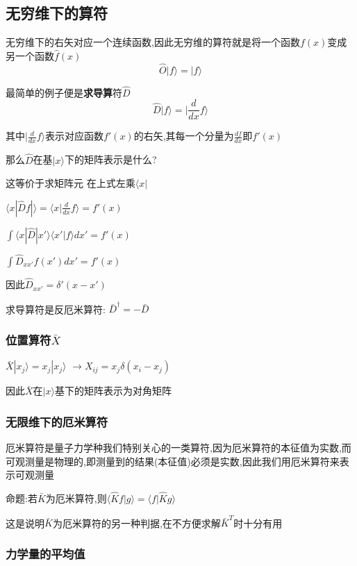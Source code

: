 \documentclass[lang=cn,10pt]{elegantbook}
\begin{document}
 \subsection{无穷维下的算符}
 无穷维下的右矢对应一个连续函数,因此无穷维的算符就是将一个函数$f(x)$变成另一个函数$\hat{f}(x)$
 \begin{equation*}
 	\hat{O}|f\rangle=|\hat{f}\rangle
 \end{equation*}
 
 最简单的例子便是\textbf{求导算}符$\hat{D}$
 \begin{equation*}
 		\hat{D}|f\rangle=|\frac{d}{dx}f\rangle
 \end{equation*}
 
 其中$|\frac{d}{dx}f\rangle$表示对应函数$f'(x)$的右矢,其每一个分量为$\frac{df}{dx}$即$f'(x)$
 
 那么$\hat{D}$在基$|x\rangle$下的矩阵表示是什么?
 
 这等价于求矩阵元
 在上式左乘$\langle x|$
 
 $\langle x|\hat{D}f|\rangle=\langle x|\frac{d}{dx}f\rangle=f'(x)$
 
 $\int{\langle x|\hat{D}|x'\rangle \langle x'|f\rangle dx' =f'(x)}$
 
 $\int{\hat{D}_{xx'}f\left( x' \right) dx'=f\prime(x)}$
 
 因此$\hat{D}_{xx'}=\delta'(x-x')$
 
 求导算符是反厄米算符: $\bar{D}^\dagger=-\bar{D}$
 
 \subsubsection{位置算符$\bar{X}$}
 $\bar{X}|x_j\rangle=x_j|x_j\rangle$
 $\rightarrow X_{ij}=x_j\delta(x_i-x_j)$
 
 因此$\bar{X}$在$|x\rangle$基下的矩阵表示为对角矩阵
 \subsubsection{无限维下的厄米算符}
 厄米算符是量子力学种我们特别关心的一类算符,因为厄米算符的本征值为实数,而可观测量是物理的,即测量到的结果(本征值)必须是实数,因此我们用厄米算符来表示可观测量
 
 命题:若$\bar{K}$为厄米算符,则$\langle \hat{K}f|g\rangle =\langle f|\hat{K}g\rangle  $
 
 这是说明$\bar{K}$为厄米算符的另一种判据,在不方便求解$\bar{K}^T$时十分有用
 \subsubsection{力学量的平均值}
 
\end{document}
